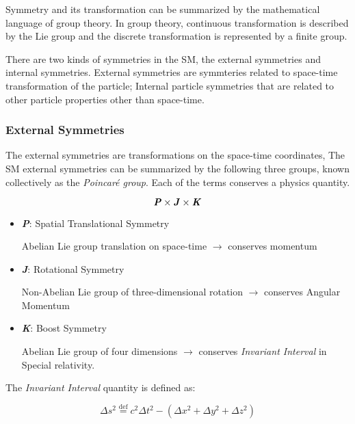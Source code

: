     Symmetry and its transformation can be summarized by the mathematical language of group theory. In group theory, continuous transformation is described by the Lie group and the discrete transformation is represented by a finite group. 

    There are two kinds of symmetries in the SM, the external symmetries and internal symmetries. External symmetries are symmteries related to space-time transformation of the particle; Internal particle symmetries that are related to other particle properties other than space-time. 

\subsubsection{External Symmetries} 
The external symmetries are transformations on the space-time coordinates, The SM external symmetries can be summarized by the following three groups, known collectively as the \textit{Poincar\'{e} group}. Each of the terms conserves a physics quantity. 
    
     \begin{equation}
     \textbf{\textit{P}} \times \textbf{\textit{J}} \times \textbf{\textit{K}}
     \end{equation}
     
    \begin{itemize}
        \item \textbf{\textit{P}}: Spatial Translational Symmetry

            Abelian Lie group translation on space-time $\rightarrow$ conserves momentum 
        \item \textbf{\textit{J}}: Rotational Symmetry

            Non-Abelian Lie group of three-dimensional rotation $\rightarrow$ conserves Angular Momentum 
        \item \textbf{\textit{K}}: Boost Symmetry 

            Abelian Lie group of four dimensions $\rightarrow$ conserves \textit{Invariant Interval} in Special relativity.
    \end{itemize}


    The \textit{Invariant Interval} quantity is defined as:

    \begin{equation}
        \Delta s^2 \overset{\mathrm{def}}{=} c^{2}\Delta t^{2} - (\Delta x^{2}+\Delta y^{2} + \Delta z^{2})
        \label{eq:InvariantInterval}
    \end{equation}

